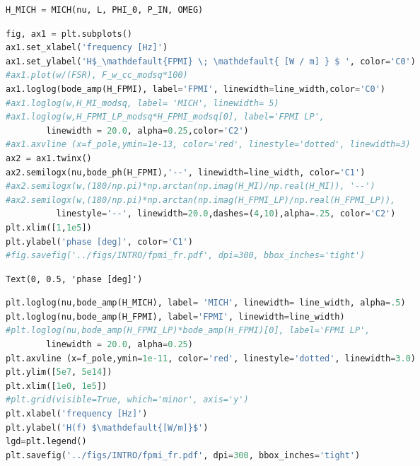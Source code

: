 \begin{spacing}{1.2} \begin{lstlisting}[frame=single, language=Python]
H_MICH = MICH(nu, L, PHI_0, P_IN, OMEG)
\end{lstlisting} \end{spacing}

\begin{spacing}{1.2} \begin{lstlisting}[frame=single, language=Python]
fig, ax1 = plt.subplots()
ax1.set_xlabel('frequency [Hz]')
ax1.set_ylabel('H$_\mathdefault{FPMI} \; \mathdefault{ [W / m] } $ ', color='C0')
#ax1.plot(w/(FSR), F_w_cc_modsq*100)
ax1.loglog(bode_amp(H_FPMI), label='FPMI', linewidth=line_width,color='C0')
#ax1.loglog(w,H_MI_modsq, label= 'MICH', linewidth= 5)
#ax1.loglog(w,H_FPMI_LP_modsq*H_FPMI_modsq[0], label='FPMI LP', 
	    linewidth = 20.0, alpha=0.25,color='C2')
#ax1.axvline (x=f_pole,ymin=1e-13, color='red', linestyle='dotted', linewidth=3)
ax2 = ax1.twinx()
ax2.semilogx(nu,bode_ph(H_FPMI),'--', linewidth=line_width, color='C1')
#ax2.semilogx(w,(180/np.pi)*np.arctan(np.imag(H_MI)/np.real(H_MI)), '--')
#ax2.semilogx(w,(180/np.pi)*np.arctan(np.imag(H_FPMI_LP)/np.real(H_FPMI_LP)),
	      linestyle='--', linewidth=20.0,dashes=(4,10),alpha=.25, color='C2')
plt.xlim([1,1e5])
plt.ylabel('phase [deg]', color='C1')
#fig.savefig('../figs/INTRO/fpmi_fr.pdf', dpi=300, bbox_inches='tight')
\end{lstlisting} \end{spacing}

\begin{spacing}{1.2} \begin{lstlisting}
Text(0, 0.5, 'phase [deg]')
\end{lstlisting} \end{spacing}

\begin{spacing}{1.2} \begin{lstlisting}[frame=single, language=Python]
plt.loglog(nu,bode_amp(H_MICH), label= 'MICH', linewidth= line_width, alpha=.5)
plt.loglog(nu,bode_amp(H_FPMI), label='FPMI', linewidth=line_width)
#plt.loglog(nu,bode_amp(H_FPMI_LP)*bode_amp(H_FPMI)[0], label='FPMI LP', 
	    linewidth = 20.0, alpha=0.25)
plt.axvline (x=f_pole,ymin=1e-11, color='red', linestyle='dotted', linewidth=3.0)
plt.ylim([5e7, 5e14])
plt.xlim([1e0, 1e5])
#plt.grid(visible=True, which='minor', axis='y')
plt.xlabel('frequency [Hz]')
plt.ylabel('H(f) $\mathdefault{[W/m]}$')
lgd=plt.legend()
plt.savefig('../figs/INTRO/fpmi_fr.pdf', dpi=300, bbox_inches='tight')
\end{lstlisting} \end{spacing}

